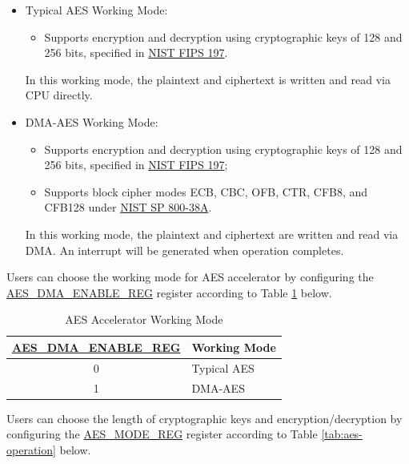 \documentclass[main\_\_EN.tex]{subfiles}
\begin{document}
\begin{itemize}
    \item Typical AES Working Mode: \begin{itemize}
        \item Supports encryption and decryption using cryptographic keys of 128 and 256 bits, specified in \href{https://nvlpubs.nist.gov/nistpubs/FIPS/NIST.FIPS.197.pdf}{NIST FIPS 197}.
    \end{itemize}
    In this working mode, the plaintext and ciphertext is written and read via CPU directly. 
    \item DMA-AES Working Mode: 
    \begin{itemize}
        \item Supports encryption and decryption using cryptographic keys of 128 and 256 bits, specified in \href{https://nvlpubs.nist.gov/nistpubs/FIPS/NIST.FIPS.197.pdf}{NIST FIPS 197}; 
        \item Supports block cipher modes ECB, CBC, OFB, CTR, CFB8, and CFB128 under \href{https://nvlpubs.nist.gov/nistpubs/Legacy/SP/nistspecialpublication800-38a.pdf}{NIST SP 800-38A}.
    \end{itemize}
    In this working mode, the plaintext and ciphertext are written and read via DMA. An interrupt will be generated when operation completes.
\end{itemize}

Users can choose the working mode for AES accelerator by configuring the \hyperref[regdesc:AESDMAENABLEREG]{AES\_DMA\_ENABLE\_REG} register according to Table \ref{tab:aes-dma-enable} below.

\begin{longtable}[c]{ | c | l | }
\caption{AES Accelerator Working Mode}
    \label{tab:aes-dma-enable}
    \\\hline 
    \rowcolor{lightgray}
\textbf{\hyperref[regdesc:AESDMAENABLEREG]{AES\_DMA\_ENABLE\_REG}}      & \textbf{Working Mode}\\
        \hline
        0                       & Typical AES    \\
        \hline
        1                       & DMA-AES        \\
        \hline
\end{longtable}

Users can choose the length of cryptographic keys and encryption/decryption by configuring the \hyperref[regdesc:AESMODEREG]{AES\_MODE\_REG} register according to Table \ref{tab:aes-operation} below.
\end{document}
